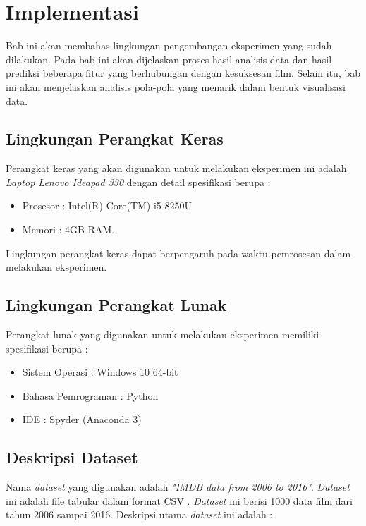 \chapter{Implementasi}
\label{chap:hasil}
Bab ini akan membahas lingkungan pengembangan eksperimen yang sudah dilakukan. Pada bab ini akan dijelaskan proses hasil analisis data dan hasil prediksi beberapa fitur yang berhubungan dengan kesuksesan film. Selain itu, bab ini akan menjelaskan analisis pola-pola yang menarik dalam bentuk visualisasi data. 


\section{Lingkungan Perangkat Keras}
Perangkat keras yang akan digunakan untuk melakukan eksperimen ini adalah \textit{Laptop Lenovo Ideapad 330} dengan detail spesifikasi berupa : 

\begin{itemize}
\item Prosesor : Intel(R) Core(TM) i5-8250U 
\item Memori   : 4GB RAM.
\end{itemize}

Lingkungan perangkat keras dapat berpengaruh pada waktu pemrosesan dalam melakukan eksperimen.


\section{Lingkungan Perangkat Lunak}
Perangkat lunak yang digunakan untuk melakukan eksperimen memiliki spesifikasi berupa : 

\begin{itemize}
\item Sistem Operasi : Windows 10 64-bit
\item Bahasa Pemrograman : Python 
\item IDE : Spyder (Anaconda 3)
\end{itemize} 


\section{Deskripsi Dataset}
\label{chap:deskripsidataset}
Nama \textit{dataset} yang digunakan adalah \textit{"IMDB data from 2006 to 2016"}. \textit{Dataset} ini adalah file tabular dalam format CSV . \textit{Dataset} ini berisi 1000 data film dari tahun 2006 sampai 2016. Deskripsi utama \textit{dataset} ini adalah :

